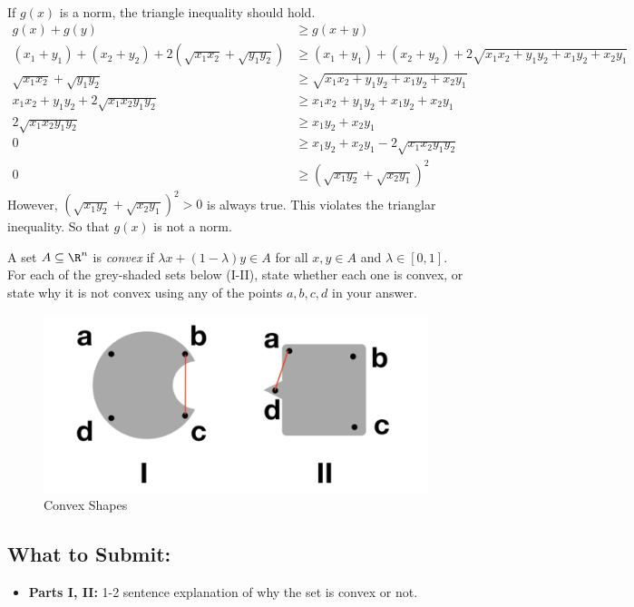 \documentclass{article}
\begin{document}
\begin{sloppypar}
\begin{aprob}
\begin{enumerate}
\begin{align*}
        \end{align*}
        If $g(x)$ is a norm, the triangle inequality should hold.
        \begin{align*}
            g(x) +g(y) &\ge g(x+y) \\
            (x_1+y_1) + (x_2+y_2) + 2(\sqrt{x_1 x_2} + \sqrt{y_1 y_2}) &\ge (x_1+y_1) + (x_2+y_2) + 2\sqrt{x_1 x_2 + y_1 y_2 + x_1 y_2 + x_2 y_1} \\
            \sqrt{x_1 x_2} + \sqrt{y_1 y_2} &\ge \sqrt{x_1 x_2 + y_1 y_2 + x_1 y_2 + x_2 y_1} \\
            x_1 x_2 + y_1 y_2 + 2\sqrt{x_1 x_2 y_1 y_2} &\ge x_1 x_2 + y_1 y_2 + x_1 y_2 + x_2 y_1 \\
            2\sqrt{x_1 x_2 y_1 y_2} &\ge x_1 y_2 + x_2 y_1 \\
            0 &\ge  x_1 y_2 + x_2 y_1 - 2\sqrt{x_1 x_2 y_1 y_2} \\
            0 & \ge (\sqrt{x_1 y_2} + \sqrt{x_2 y_1})^2
        \end{align*}
        However, $(\sqrt{x_1 y_2} + \sqrt{x_2 y_1})^2 > 0$ is always true. 
        This violates the trianglar inequality. So that $g(x)$ is not a norm.
    \end{enumerate}
\end{aprob}


\begin{aprob}
     A set $A \subseteq \R^n$ is \emph{convex} if $\lambda x + (1-\lambda) y \in A$ for all $x,y\in A$ and $\lambda \in [0,1]$.
    For each of the grey-shaded sets below (I-II), state whether each one is convex, or state why it is not convex using any of the points $a,b,c,d$ in your answer. 
    
    \begin{figure}[!h]
        \centering
        \includegraphics[width=.6\textwidth]{./img/convex_shapes2.png}
        \caption{Convex Shapes}
        \label{fig:conve_shapes}
    \end{figure}

    \subsection*{What to Submit:}
    \begin{itemize}
        \item \textbf{Parts I, II:} 1-2 sentence explanation of why the set is convex or not.
    \end{itemize}

\end{aprob}
\end{sloppypar}
\end{document}
